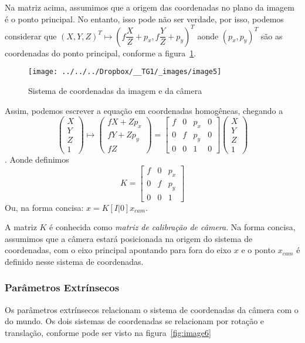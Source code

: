 \documentclass[ecp,tc]{iiufrgs}
\begin{document}
Na matriz acima, assumimos que a origem das coordenadas no plano da imagem é o ponto principal. No entanto, isso pode não ser verdade, por isso, podemos considerar que $ (X, Y, Z)^T \mapsto (f\dfrac{X}{Z} + p_x, f\dfrac{Y}{Z} + p_y)^T $ aonde $ (p_x, p_y)^T $ são as coordenadas do ponto principal, conforme a figura~\ref{fig:image5}.

\begin{figure}
	\centering
	\caption{Sistema de coordenadas da imagem e da câmera}
	\texttt{[image: ../../../Dropbox/\_\_TG1/\_images/image5]}
	\label{fig:image5}
\end{figure}

Assim, podemos escrever a equação em coordenadas homogêneas, chegando a
\[\begin{pmatrix} X \\ Y \\ Z \\ 1 \end{pmatrix} \mapsto \begin{pmatrix} fX+Zp_x \\ fY+Zp_y \\ fZ \end{pmatrix} = \begin{bmatrix} f & 0  & p_x & 0 \\ 0 & f & p_y & 0 \\ 0 & 0 & 1 & 0 \end{bmatrix} \begin{pmatrix} X \\ Y \\ Z \\ 1 \end{pmatrix} \].
Aonde definimos
\[K = \begin{bmatrix} f & 0  & p_x  \\ 0 & f & p_y \\ 0 & 0 & 1\end{bmatrix}\]
Ou, na forma concisa: $ x = K[I|0]x_{cam}$.

A matriz $ K $ é conhecida como \textit{matriz de calibração de câmera}. Na forma concisa, assumimos que a câmera estará posicionada na origem do sistema de coordenadas, com o eixo principal apontando para fora do eixo $ x $ e o ponto $ x_{cam} $ é definido nesse sistema de coordenadas.

\subsubsection{Parâmetros Extrínsecos}
\label{sec:extrinsic}
Os parâmetros extrínsecos relacionam o sistema de coordenadas da câmera com o do mundo. Os dois sistemas de coordenadas se relacionam por rotação e translação, conforme pode ser visto na figura~\ref{fig:image6}
\end{document}
